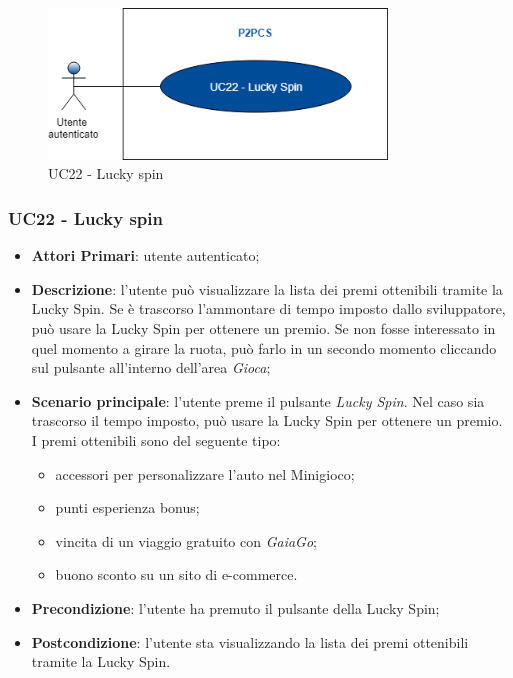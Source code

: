 \begin{figure}[h]
	\includegraphics[width=9cm]{res/images/UC20Luckyspin.png}
	\centering
	\caption{UC22 - Lucky spin}
\end{figure}
\subsubsection{UC22 - Lucky spin}
\begin{itemize}
	\item \textbf{Attori Primari}: utente autenticato;
	\item \textbf{Descrizione}:	l'utente può visualizzare la lista dei premi ottenibili tramite la Lucky Spin\glo. Se è trascorso l'ammontare di tempo imposto dallo sviluppatore, può usare la Lucky Spin per ottenere un premio. Se non fosse interessato in quel momento a girare la ruota, può farlo in un secondo momento cliccando sul pulsante all'interno dell'area \textit{Gioca};
	\item \textbf{Scenario principale}: l'utente preme il pulsante \textit{Lucky Spin}. Nel caso sia trascorso il tempo imposto, può usare la Lucky Spin per ottenere un premio. I premi ottenibili sono del seguente tipo:
	\begin{itemize}
		\item accessori per personalizzare l'auto nel Minigioco;
		\item punti esperienza bonus;
		\item vincita di un viaggio gratuito con \textit{GaiaGo};
		\item buono sconto su un sito di e-commerce.	
	\end{itemize}
	\item \textbf{Precondizione}: l'utente ha premuto il pulsante della Lucky Spin;
	\item \textbf{Postcondizione}: l'utente sta visualizzando la lista dei premi ottenibili tramite la Lucky Spin.
\end{itemize}
